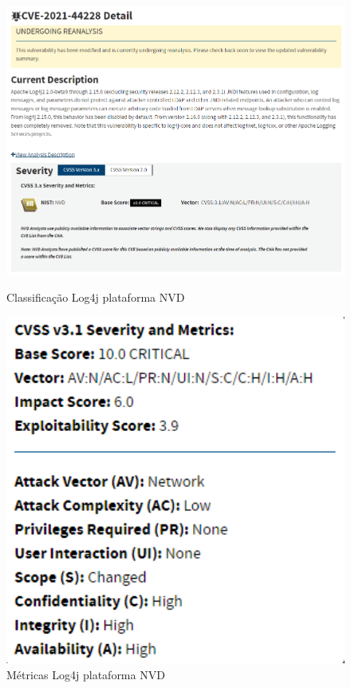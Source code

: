 \documentclass[11t]{article}
\begin{document}
\begin{figure}[H]
    \centering
    \begin{minipage}{0.62\textwidth}
        \centering
        \includegraphics[width=1\textwidth]{images/classificacaoPergunta2.png}
        \caption{Classificação Log4j plataforma NVD}
    \end{minipage}
    \hfill
    \begin{minipage}{0.36\textwidth}
        \centering
        \includegraphics[width=1\textwidth]{images/metricasPergunta2.png}
        \caption{Métricas Log4j plataforma NVD}
    \end{minipage}
\end{figure}
\end{document}
